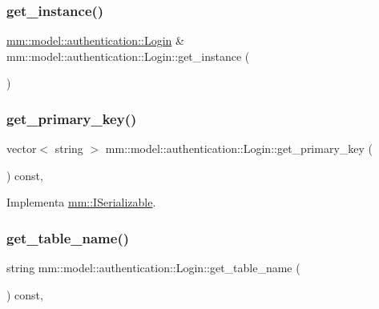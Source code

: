 \subsubsection{\texorpdfstring{get\+\_\+instance()}{get\_instance()}}
{\footnotesize\ttfamily \hyperlink{structmm_1_1model_1_1authentication_1_1_login}{mm\+::model\+::authentication\+::\+Login} \& mm\+::model\+::authentication\+::\+Login\+::get\+\_\+instance (\begin{DoxyParamCaption}{ }\end{DoxyParamCaption})\hspace{0.3cm}{\ttfamily [static]}}

\mbox{\label{structmm_1_1model_1_1authentication_1_1_login_a56f5da26be2d64baa78d0c81d99c8221}} 
\subsubsection{\texorpdfstring{get\+\_\+primary\+\_\+key()}{get\_primary\_key()}}
{\footnotesize\ttfamily vector$<$ string $>$ mm\+::model\+::authentication\+::\+Login\+::get\+\_\+primary\+\_\+key (\begin{DoxyParamCaption}{ }\end{DoxyParamCaption}) const\hspace{0.3cm}{\ttfamily [override]}, {\ttfamily [virtual]}}



Implementa \hyperlink{classmm_1_1_i_serializable_a69c0c514e11e386b6cb1fbd03f14da17}{mm\+::\+I\+Serializable}.

\mbox{\label{structmm_1_1model_1_1authentication_1_1_login_afc72adef91be3d97ce4751b8a2357613}} 
\subsubsection{\texorpdfstring{get\+\_\+table\+\_\+name()}{get\_table\_name()}}
{\footnotesize\ttfamily string mm\+::model\+::authentication\+::\+Login\+::get\+\_\+table\+\_\+name (\begin{DoxyParamCaption}{ }\end{DoxyParamCaption}) const\hspace{0.3cm}{\ttfamily [override]}, {\ttfamily [virtual]}}



